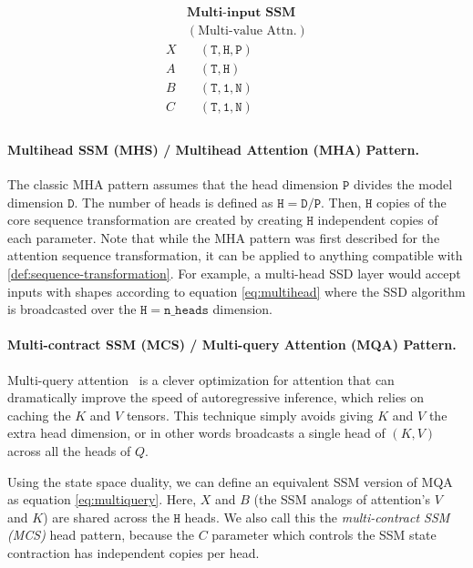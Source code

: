 \documentclass{article}
\newcommand{\citep}{\parencite}
\begin{document}
\begin{minipage}[t]{.25\linewidth}
  \begin{equation}
    \label{eq:multivalue}
    \begin{aligned}
    & \textbf{Multi-input SSM} \\
    & (\textrm{Multi-value Attn.}) \\
      X & \quad \mathtt{(T, H, P)} \\
      A & \quad \mathtt{(T, H)} \\
      B & \quad \mathtt{(T, 1, N)} \\
      C & \quad \mathtt{(T, 1, N)} \\
    \end{aligned}
  \end{equation}
\end{minipage}

\paragraph{Multihead SSM (MHS) / Multihead Attention (MHA) Pattern.}

The classic MHA pattern assumes that the head dimension $\mathtt{P}$ divides the model dimension $\mathtt{D}$.
The number of heads is defined as $\mathtt{H} = \mathtt{D} / \mathtt{P}$.
Then, $\mathtt{H}$ copies of the core sequence transformation are created by creating $\mathtt{H}$ independent copies of each parameter.
Note that while the MHA pattern was first described for the attention sequence transformation,
it can be applied to anything compatible with \cref{def:sequence-transformation}.
For example, a multi-head SSD layer would accept inputs with shapes according to equation \eqref{eq:multihead}
where the SSD algorithm is broadcasted over the $\mathtt{H} = \mathtt{n\_heads}$ dimension.

\paragraph{Multi-contract SSM (MCS) / Multi-query Attention (MQA) Pattern.}

Multi-query attention~\citep{shazeer2019fast} is a clever optimization for attention that can dramatically improve the speed of autoregressive inference,
which relies on caching the $K$ and $V$ tensors.
This technique simply avoids giving $K$ and $V$ the extra head dimension,
or in other words broadcasts a single head of $(K, V)$ across all the heads of $Q$.

Using the state space duality, we can define an equivalent SSM version of MQA as equation \eqref{eq:multiquery}.
Here, $X$ and $B$ (the SSM analogs of attention's $V$ and $K$) are shared across the $\mathtt{H}$ heads.
We also call this the \emph{multi-contract SSM (MCS)} head pattern, because the $C$ parameter which controls the SSM state contraction has independent copies per head.
\end{document}
